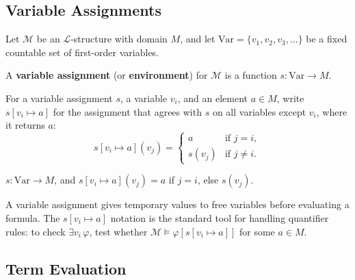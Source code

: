 
\subsection{Variable Assignments}

\begin{tcolorbox}[colback=propbox, colframe=propborder, arc=2pt,
  left=6pt, right=6pt, top=4pt, bottom=4pt,
  title={\small\textbf{Definition (Variable Assignment)}},
  fonttitle=\small\bfseries]
\label{def:variable-assignment}
Let $\mathcal{M}$ be an $\mathcal{L}$-structure with domain $M$, and let
$\mathrm{Var} = \{v_1, v_2, v_3, \ldots\}$ be a fixed countable set of
first-order variables.

A \textbf{variable assignment} (or \textbf{environment}) for $\mathcal{M}$
is a function $s : \mathrm{Var} \to M$.

For a variable assignment $s$, a variable $v_i$, and an element $a \in M$,
write $s[v_i \mapsto a]$ for the assignment that agrees with $s$ on all
variables except $v_i$, where it returns $a$:
\[
  s[v_i \mapsto a](v_j) =
  \begin{cases}
    a      & \text{if } j = i, \\
    s(v_j) & \text{if } j \neq i.
  \end{cases}
\]
\end{tcolorbox}

\begin{remark*}
$s : \mathrm{Var} \to M$, and
$s[v_i \mapsto a](v_j) = a$ if $j = i$, else $s(v_j)$.
\end{remark*}

\begin{remark*}[Intuition]
A variable assignment gives temporary values to free variables before
evaluating a formula. The $s[v_i \mapsto a]$ notation is the standard
tool for handling quantifier rules: to check $\exists v_i\,\varphi$,
test whether $\mathcal{M} \models \varphi[s[v_i \mapsto a]]$ for some
$a \in M$.
\end{remark*}


\subsection{Term Evaluation}


